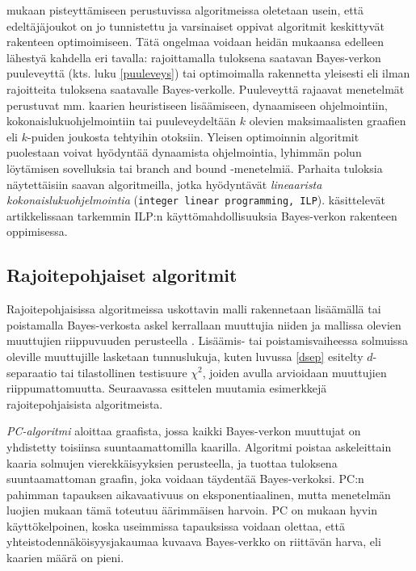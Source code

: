 \citet{scanagatta_survey_2019} mukaan pisteyttämiseen perustuvissa algoritmeissa oletetaan usein, että edeltäjäjoukot on jo tunnistettu ja varsinaiset oppivat algoritmit keskittyvät rakenteen optimoimiseen. Tätä ongelmaa voidaan heidän mukaansa edelleen lähestyä kahdella eri tavalla: rajoittamalla tuloksena saatavan Bayes-verkon puuleveyttä (kts. luku \ref{puuleveys}) tai optimoimalla rakennetta yleisesti eli ilman rajoitteita tuloksena saatavalle Bayes-verkolle. Puuleveyttä rajaavat menetelmät perustuvat mm. kaarien heuristiseen lisäämiseen, dynaamiseen ohjelmointiin, kokonaislukuohjelmointiin tai puuleveydeltään $k$ olevien maksimaalisten graafien eli $k$-puiden joukosta tehtyihin otoksiin. Yleisen optimoinnin algoritmit puolestaan voivat hyödyntää dynaamista ohjelmointia, lyhimmän polun löytämisen sovelluksia tai branch and bound -menetelmiä. Parhaita tuloksia näytettäisiin saavan algoritmeilla, jotka hyödyntävät \emph{lineaarista kokonaislukuohjelmointia} (\texttt{integer linear programming, ILP}). \citet{bartlett_integer_2017} käsittelevät artikkelissaan tarkemmin  ILP:n käyttömahdollisuuksia Bayes-verkon rakenteen oppimisessa. 

\subsection{Rajoitepohjaiset algoritmit} 

Rajoitepohjaisissa algoritmeissa uskottavin malli rakennetaan lisäämällä tai poistamalla Bayes-verkosta askel kerrallaan muuttujia niiden ja mallissa olevien muuttujien riippuvuuden perusteella \citep{ramsahai_connecting_2020, scutari_learning_2010}. Lisäämis- tai poistamisvaiheessa solmuissa oleville muuttujille lasketaan tunnuslukuja, kuten luvussa \ref{dsep} esitelty $d$-separaatio tai tilastollinen testisuure $\chi^2$, joiden avulla arvioidaan muuttujien riippumattomuutta. Seuraavassa esittelen muutamia esimerkkejä rajoitepohjaisista algoritmeista. 

\emph{PC-algoritmi} \citep{spirtes_causation_1993, tsagris_bayesian_2019} aloittaa graafista, jossa kaikki Bayes-verkon muuttujat on yhdistetty toisiinsa suuntaamattomilla kaarilla. Algoritmi poistaa askeleittain kaaria solmujen vierekkäisyyksien perusteella, ja tuottaa tuloksena suuntaamattoman graafin, joka voidaan täydentää Bayes-verkoksi. PC:n pahimman tapauksen aikavaativuus on eksponentiaalinen, mutta menetelmän luojien mukaan tämä toteutuu äärimmäisen harvoin. PC on \citet{scanagatta_survey_2019} mukaan hyvin käyttökelpoinen, koska useimmissa tapauksissa voidaan olettaa, että yhteistodennäköisyysjakaumaa kuvaava Bayes-verkko on riittävän harva, eli kaarien määrä on pieni. 

